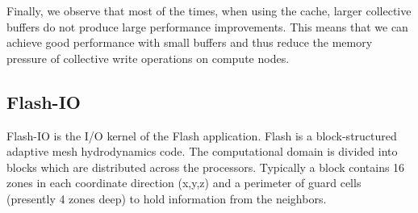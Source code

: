 Finally, we observe that most of the times, when using the cache, larger collective buffers do not produce large performance improvements. This means that we can achieve good performance with small buffers and thus reduce the memory pressure of collective write operations on compute nodes.

\subsection{Flash-IO}
\label{subsec: flash}
Flash-IO is the I/O kernel of the Flash application. Flash is a block-structured adaptive mesh hydrodynamics code. The computational domain is divided into blocks which are distributed across the processors. Typically a block contains 16 zones in each coordinate direction (x,y,z) and a perimeter of guard cells (presently 4 zones deep) to hold information from the neighbors. 
